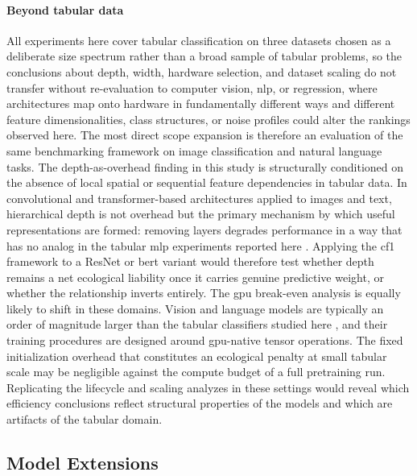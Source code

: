 \paragraph{Beyond tabular data}
All experiments here cover tabular classification on three datasets chosen as a deliberate size spectrum rather than a broad sample of tabular problems, so the conclusions about depth, width, hardware selection, and dataset scaling do not transfer without re-evaluation to computer vision, \gls{nlp}, or regression, where architectures map onto hardware in fundamentally different ways and different feature dimensionalities, class structures, or noise profiles could alter the rankings observed here. The most direct scope expansion is therefore an evaluation of the same benchmarking framework on image classification and natural language tasks. The depth-as-overhead finding in this study is structurally conditioned on the absence of local spatial or sequential feature dependencies in tabular data. In convolutional and transformer-based architectures applied to images and text, hierarchical depth is not overhead but the primary mechanism by which useful representations are formed: removing layers degrades performance in a way that has no analog in the tabular \gls{mlp} experiments reported here \cite{grinsztajnWhyTreebasedModels2022a}. Applying the \gls{cf1} framework to a ResNet or \gls{bert} variant would therefore test whether depth remains a net ecological liability once it carries genuine predictive weight, or whether the relationship inverts entirely. The \gls{gpu} break-even analysis is equally likely to shift in these domains. Vision and language models are typically an order of magnitude larger than the tabular classifiers studied here \cite{pattersonCarbonEmissionsLarge2021}, and their training procedures are designed around \gls{gpu}-native tensor operations. The fixed initialization overhead that constitutes an ecological penalty at small tabular scale may be negligible against the compute budget of a full pretraining run. %
Replicating the lifecycle and scaling analyzes in these settings would reveal which efficiency conclusions reflect structural properties of the models and which are artifacts of the tabular domain.

\subsection{Model Extensions}

